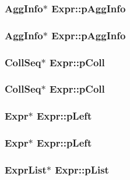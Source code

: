 \subsubsection{\setlength{\rightskip}{0pt plus 5cm}\bf{Agg\-Info}$\ast$ \bf{Expr::p\-Agg\-Info}}\label{structExpr_53d22bfcb76f129581f8463f76e20021}


\subsubsection{\setlength{\rightskip}{0pt plus 5cm}\bf{Agg\-Info}$\ast$ \bf{Expr::p\-Agg\-Info}}\label{structExpr_53d22bfcb76f129581f8463f76e20021}


\subsubsection{\setlength{\rightskip}{0pt plus 5cm}\bf{Coll\-Seq}$\ast$ \bf{Expr::p\-Coll}}\label{structExpr_a0ba7ae97e7761f7a1f567b0a9bb6350}


\subsubsection{\setlength{\rightskip}{0pt plus 5cm}\bf{Coll\-Seq}$\ast$ \bf{Expr::p\-Coll}}\label{structExpr_a0ba7ae97e7761f7a1f567b0a9bb6350}


\subsubsection{\setlength{\rightskip}{0pt plus 5cm}\bf{Expr}$\ast$ \bf{Expr::p\-Left}}\label{structExpr_7e12cccae737517c55635926ba4091e2}


\subsubsection{\setlength{\rightskip}{0pt plus 5cm}\bf{Expr}$\ast$ \bf{Expr::p\-Left}}\label{structExpr_7e12cccae737517c55635926ba4091e2}


\subsubsection{\setlength{\rightskip}{0pt plus 5cm}\bf{Expr\-List}$\ast$ \bf{Expr::p\-List}}\label{structExpr_8eb0b59798c61d147a051fbd93a0983c}


